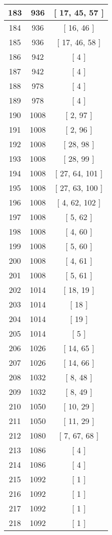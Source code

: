 \begin{center}
\begin{longtable}[H]{|| c c c ||}
\hline
183 & 936 & [ 17, 45, 57 ] \\ 
\hline
184 & 936 & [ 16, 46 ] \\ 
\hline
185 & 936 & [ 17, 46, 58 ] \\ 
\hline
186 & 942 & [ 4 ] \\ 
\hline
187 & 942 & [ 4 ] \\ 
\hline
188 & 978 & [ 4 ] \\ 
\hline
189 & 978 & [ 4 ] \\ 
\hline
190 & 1008 & [ 2, 97 ] \\ 
\hline
191 & 1008 & [ 2, 96 ] \\ 
\hline
192 & 1008 & [ 28, 98 ] \\ 
\hline
193 & 1008 & [ 28, 99 ] \\ 
\hline
194 & 1008 & [ 27, 64, 101 ] \\ 
\hline
195 & 1008 & [ 27, 63, 100 ] \\ 
\hline
196 & 1008 & [ 4, 62, 102 ] \\ 
\hline
197 & 1008 & [ 5, 62 ] \\ 
\hline
198 & 1008 & [ 4, 60 ] \\ 
\hline
199 & 1008 & [ 5, 60 ] \\ 
\hline
200 & 1008 & [ 4, 61 ] \\ 
\hline
201 & 1008 & [ 5, 61 ] \\ 
\hline
202 & 1014 & [ 18, 19 ] \\ 
\hline
203 & 1014 & [ 18 ] \\ 
\hline
204 & 1014 & [ 19 ] \\ 
\hline
205 & 1014 & [ 5 ] \\ 
\hline
206 & 1026 & [ 14, 65 ] \\ 
\hline
207 & 1026 & [ 14, 66 ] \\ 
\hline
208 & 1032 & [ 8, 48 ] \\ 
\hline
209 & 1032 & [ 8, 49 ] \\ 
\hline
210 & 1050 & [ 10, 29 ] \\ 
\hline
211 & 1050 & [ 11, 29 ] \\ 
\hline
212 & 1080 & [ 7, 67, 68 ] \\ 
\hline
213 & 1086 & [ 4 ] \\ 
\hline
214 & 1086 & [ 4 ] \\ 
\hline
215 & 1092 & [ 1 ] \\ 
\hline
216 & 1092 & [ 1 ] \\ 
\hline
217 & 1092 & [ 1 ] \\ 
\hline
218 & 1092 & [ 1 ] \\ 

\end{longtable}
\end{center}
